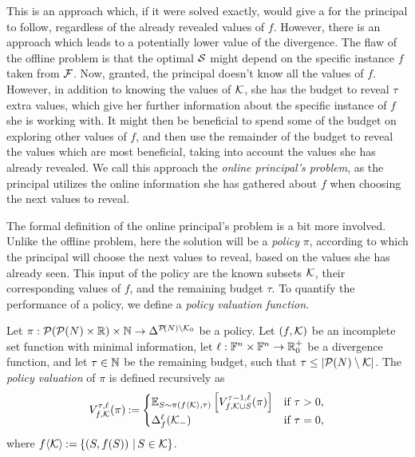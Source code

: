 This is an approach which, if it were solved exactly, would give a  for the principal to follow, regardless of the already revealed values of $ f $.
However, there is an approach which leads to a potentially lower value of the divergence.
The flaw of the offline problem is that the optimal $ \mathcal{S} $ might depend on the specific instance $ f $ taken from $ \mathcal{F} $.
Now, granted, the principal doesn't know all the values of $ f $.
However, in addition to knowing the values of $ \mathcal{K} $, she has the budget to reveal $ \tau $ extra values, which give her further information about the specific instance of $ f $ she is working with.
It might then be beneficial to spend some of the budget on exploring other values of $ f $,
and then use the remainder of the budget to reveal the values which are most beneficial, taking into account the values she has already revealed.
We call this approach the \emph{online principal's problem}, as the principal utilizes the online information she has gathered about $ f $ when choosing the next values to reveal.


The formal definition of the online principal's problem is a bit more involved.
Unlike the offline problem, here the solution will be a \emph{policy} $ \pi $, according to which the principal will choose the next values to reveal, based on the values she has already seen.
This input of the policy are the known subsets $ \mathcal{K} $, their corresponding values of $ f $, and the remaining budget $ \tau $.
To quantify the performance of a policy, we define a \emph{policy valuation function}.

\begin{defi}\label{def:online-pv}
  Let $ \pi: \mathcal{P}\!\left(\mathcal{P}\!\left(N\right) \times \mathbb{R}\right) \times \mathbb{N} \to \Delta^{\mathcal{P}\!\left(N\right) \setminus \mathcal{K}_0} $ be a policy.
  Let $ \left( f, \mathcal{K} \right) $ be an incomplete set function with minimal information, let $ \ell: \mathbb{F}^n \times \mathbb{F}^n \to \mathbb{R}^+_0 $ be a divergence function,
  and let $ \tau \in \mathbb{N} $ be the remaining budget, such that $ \tau \leq \left\lvert \mathcal{P}\!\left(N\right) \setminus \mathcal{K} \right\rvert $.
  The \emph{policy valuation} of $ \pi $ is defined recursively as \[
    V^{\tau,\ell}_{f,\mathcal{K}}\!\left(\pi\right) \mathbin{:=} \begin{cases}
      \operatorname*{\mathbb{E}}_{S \sim \pi(f\left< \mathcal{K} \right>, \tau)} \left[ V^{\tau - 1,\ell}_{f,\mathcal{K} \cup S}\!\left(\pi\right) \right] & \text{if } \tau > 0, \\
      \Delta_{f}^{\ell}\!\left(\mathcal{K}_-\right) & \text{if } \tau = 0,
    \end{cases}
  \]
  where $ f \!\left< \mathcal{K} \right> \mathbin{:=} \left\{ \left( S, f\!\left(S\right) \right) \,|\, S \in \mathcal{K} \right\} $.
\end{defi}

